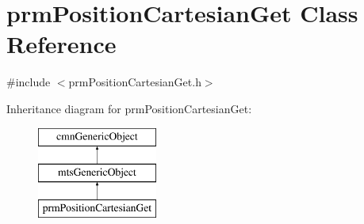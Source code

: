 \hypertarget{classprm_position_cartesian_get}{}\section{prm\+Position\+Cartesian\+Get Class Reference}
\label{classprm_position_cartesian_get}


{\ttfamily \#include $<$prm\+Position\+Cartesian\+Get.\+h$>$}

Inheritance diagram for prm\+Position\+Cartesian\+Get\+:\begin{figure}[H]
\begin{center}
\leavevmode
\includegraphics[height=3.000000cm]{d8/d9d/classprm_position_cartesian_get}
\end{center}
\end{figure}
